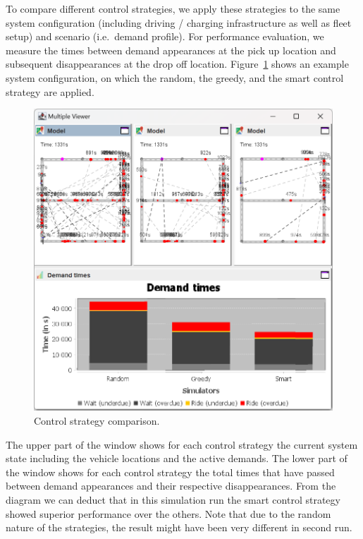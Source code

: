 \documentclass[a4paper,twoside]{article}
\begin{document}
	To compare different control strategies, we apply these strategies to the same system configuration (including driving / charging infrastructure as well as fleet setup) and scenario (i.e.\ demand profile).
	For performance evaluation, we measure the times between demand appearances at the pick up location and subsequent disappearances at the drop off location.
	Figure~\ref{fig:controller-comparison} shows an example system configuration, on which the random, the greedy, and the smart control strategy are applied.
	
	\begin{figure}[!ht]
		\includegraphics[width=\columnwidth]{controller_comparison.png}
		\caption{Control strategy comparison.}
		\label{fig:controller-comparison}
	\end{figure}
	
	The upper part of the window shows for each control strategy the current system state including the vehicle locations and the active demands.
	The lower part of the window shows for each control strategy the total times that have passed between demand appearances and their respective disappearances.
	From the diagram we can deduct that in this simulation run the smart control strategy showed superior performance over the others.
	Note that due to the random nature of the strategies, the result might have been very different in second run.
	
\end{document}
